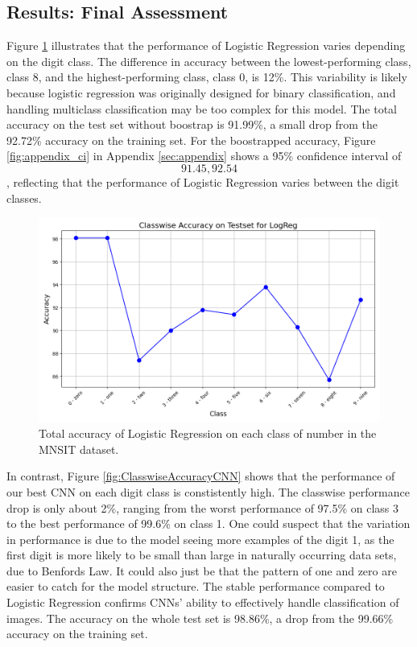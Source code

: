 \subsection{Results: Final Assessment}

Figure \ref{fig:ClasswiseAccuracyLogReg} illustrates that the performance of Logistic Regression varies depending on the digit class. The difference in accuracy between the lowest-performing class, class 8, and the highest-performing class, class 0, is 12\%. This variability is likely because logistic regression was originally designed for binary classification, and handling multiclass classification may be too complex for this model. The total accuracy on the test set without boostrap is 91.99\%, a small drop from the 92.72\% accuracy on the training set. For the boostrapped accuracy, Figure \ref{fig:appendix_ci} in Appendix \ref{sec:appendix} shows a 95\% confidence interval of \[91.45, 92.54\], reflecting that the performance of Logistic Regression varies between the digit classes.
\begin{figure}[H]
    \centering
    \includegraphics[width=\textwidth]{results/evaluation/LogReg_classwise_acc.png}
    \caption{Total accuracy of Logistic Regression on each class of number in the MNSIT dataset.}
    \label{fig:ClasswiseAccuracyLogReg}
\end{figure}
In contrast, Figure \ref{fig:ClasswiseAccuracyCNN} shows that the performance of our best CNN on each digit class is constistently high. The classwise performance drop is only about 2\%, ranging from the worst performance of 97.5\% on class 3 to the best performance of 99.6\% on class 1. One could suspect that the variation in performance is due to the model seeing more examples of the digit 1, as the first digit is more likely to be small than large in naturally occurring data sets, due to Benfords Law. It could also just be that the pattern of one and zero are easier to catch for the model structure. The stable performance compared to Logistic Regression confirms CNNs' ability to effectively handle classification of images. The accuracy on the whole test set is 98.86\%, a drop from the 99.66\% accuracy on the training set.
